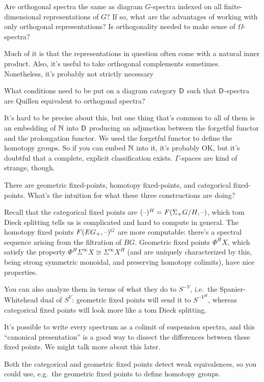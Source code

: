 \begin{ques}
Are orthogonal spectra the same as diagram $G$-spectra indexed on all finite-dimensional representations of $G$? If
so, what are the advantages of working with only orthogonal representations? Is orthogonality needed to make sense
of $\Omega$-spectra?
\end{ques}
Much of it is that the representations in question often come with a natural inner product. Also, it's useful to
take orthogonal complements sometimes. Nonetheless, it's probably not strictly necessary
\begin{ques}
What conditions need to be put on a diagram category $\mathsf D$ such that $\mathsf D$-spectra are Quillen equivalent to
orthogonal spectra?
\end{ques}
It's hard to be precise about this, but one thing that's common to all of them is an embedding of $\mathbb N$ into $\mathsf D$
producing an adjunction between the forgetful functor and the prolongation functor. We used the forgetful functor
to define the homotopy groups. So if you can embed $\mathbb N$ into it, it's probably OK, but it's doubtful that a
complete, explicit classification exists. $\Gamma$-spaces are kind of strange, though.
\begin{ques}
There are geometric fixed-points, homotopy fixed-points, and categorical fixed-points. What's the intuition for
what these three constructions are doing?
\end{ques}
Recall that the categorical fixed points are $(\text{--})^H = F(\Sigma_+ G/H,\text{--})$, which tom Dieck splitting tells us is
complicated and hard to compute in general. The homotopy fixed points $F(EG_+,\text{--})^G$ are more computable: there's
a spectral sequence arising from the filtration of $BG$. Geometric fixed points $\Phi^HX$, which satisfy the
property $\Phi^H\Sigma^\infty X \cong \Sigma^\infty X^H$ (and are uniquely characterized by this, being strong
symmetric monoidal, and preserving homotopy colimits), have nice properties.

You can also analyze them in terms of what they do to $S^{-V}$, i.e.\ the Spanier-Whitehead dual of $S^V$:
geometric fixed points will send it to $S^{-V^H}$, whereas categorical fixed points will look more like a tom Dieck
splitting.

It's possible to write every spectrum as a colimit of suspension spectra, and this ``canonical presentation'' is a
good way to dissect the differences between these fixed points. We might talk more about this later.

Both the categorical and geometric fixed points detect weak equivalences, so you could use, e.g.\ the geometric
fixed points to define homotopy groups.

